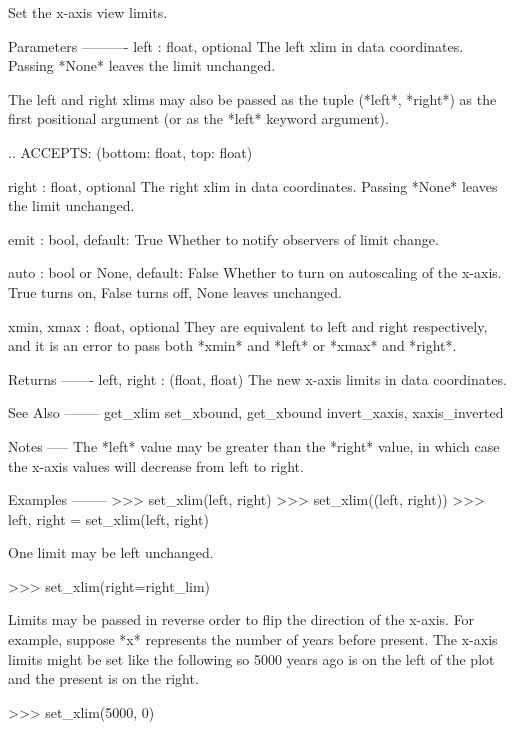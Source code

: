 \begin{DoxyVerb}Set the x-axis view limits.

Parameters
----------
left : float, optional
    The left xlim in data coordinates. Passing *None* leaves the
    limit unchanged.

    The left and right xlims may also be passed as the tuple
    (*left*, *right*) as the first positional argument (or as
    the *left* keyword argument).

    .. ACCEPTS: (bottom: float, top: float)

right : float, optional
    The right xlim in data coordinates. Passing *None* leaves the
    limit unchanged.

emit : bool, default: True
    Whether to notify observers of limit change.

auto : bool or None, default: False
    Whether to turn on autoscaling of the x-axis. True turns on,
    False turns off, None leaves unchanged.

xmin, xmax : float, optional
    They are equivalent to left and right respectively,
    and it is an error to pass both *xmin* and *left* or
    *xmax* and *right*.

Returns
-------
left, right : (float, float)
    The new x-axis limits in data coordinates.

See Also
--------
get_xlim
set_xbound, get_xbound
invert_xaxis, xaxis_inverted

Notes
-----
The *left* value may be greater than the *right* value, in which
case the x-axis values will decrease from left to right.

Examples
--------
>>> set_xlim(left, right)
>>> set_xlim((left, right))
>>> left, right = set_xlim(left, right)

One limit may be left unchanged.

>>> set_xlim(right=right_lim)

Limits may be passed in reverse order to flip the direction of
the x-axis. For example, suppose *x* represents the number of
years before present. The x-axis limits might be set like the
following so 5000 years ago is on the left of the plot and the
present is on the right.

>>> set_xlim(5000, 0)\end{DoxyVerb}
 \mbox{\label{classmatplotlib_1_1axes_1_1__base_1_1__AxesBase_a1abfc0d9808356a70790db1782e590ca}} 
